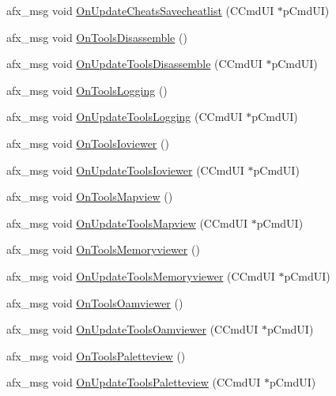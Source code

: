 \begin{DoxyCompactItemize}
\item 
afx\+\_\+msg void \mbox{\hyperlink{class_main_wnd_ae49480ad4a8f36b444eef64f77f65806}{On\+Update\+Cheats\+Savecheatlist}} (C\+Cmd\+UI $\ast$p\+Cmd\+UI)
\item 
afx\+\_\+msg void \mbox{\hyperlink{class_main_wnd_a9344948fd01b5295707700e2ba4eaee4}{On\+Tools\+Disassemble}} ()
\item 
afx\+\_\+msg void \mbox{\hyperlink{class_main_wnd_aea8ccf27ebeaa61f96f6818d4c4ead3a}{On\+Update\+Tools\+Disassemble}} (C\+Cmd\+UI $\ast$p\+Cmd\+UI)
\item 
afx\+\_\+msg void \mbox{\hyperlink{class_main_wnd_a18b152a47c0ce3d299120f5b3631232b}{On\+Tools\+Logging}} ()
\item 
afx\+\_\+msg void \mbox{\hyperlink{class_main_wnd_a304d0e3ec18ccd207ddaf1effc9019b0}{On\+Update\+Tools\+Logging}} (C\+Cmd\+UI $\ast$p\+Cmd\+UI)
\item 
afx\+\_\+msg void \mbox{\hyperlink{class_main_wnd_a7c63493ab974ac97642c7ac683cdb6f1}{On\+Tools\+Ioviewer}} ()
\item 
afx\+\_\+msg void \mbox{\hyperlink{class_main_wnd_a0ad22b86f8eac276ed6be53909f1400f}{On\+Update\+Tools\+Ioviewer}} (C\+Cmd\+UI $\ast$p\+Cmd\+UI)
\item 
afx\+\_\+msg void \mbox{\hyperlink{class_main_wnd_ab80b793bf5f38350a4c213677583ad24}{On\+Tools\+Mapview}} ()
\item 
afx\+\_\+msg void \mbox{\hyperlink{class_main_wnd_a2a5c40477c6841deb29e03e5fb0c6b5b}{On\+Update\+Tools\+Mapview}} (C\+Cmd\+UI $\ast$p\+Cmd\+UI)
\item 
afx\+\_\+msg void \mbox{\hyperlink{class_main_wnd_ada5f0ce84127265d01a332262bbfe709}{On\+Tools\+Memoryviewer}} ()
\item 
afx\+\_\+msg void \mbox{\hyperlink{class_main_wnd_afaa4badc2595220f6bf9c38f337fd287}{On\+Update\+Tools\+Memoryviewer}} (C\+Cmd\+UI $\ast$p\+Cmd\+UI)
\item 
afx\+\_\+msg void \mbox{\hyperlink{class_main_wnd_a4509ef876a03e499fe8e676224202e63}{On\+Tools\+Oamviewer}} ()
\item 
afx\+\_\+msg void \mbox{\hyperlink{class_main_wnd_afa65b90a781b4edc8122ed4673115202}{On\+Update\+Tools\+Oamviewer}} (C\+Cmd\+UI $\ast$p\+Cmd\+UI)
\item 
afx\+\_\+msg void \mbox{\hyperlink{class_main_wnd_a0d76be8ae46c1e556ec0323b4373bddc}{On\+Tools\+Paletteview}} ()
\item 
afx\+\_\+msg void \mbox{\hyperlink{class_main_wnd_a0866cdfcf1bbe035762b7dc45b156f98}{On\+Update\+Tools\+Paletteview}} (C\+Cmd\+UI $\ast$p\+Cmd\+UI)

\end{DoxyCompactItemize}
